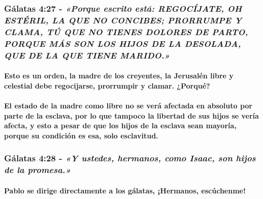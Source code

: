\documentclass[11a pt,twoside]{article}
\newcommand{\scripture}[1]{%
  {\fontsize{12pt}{16pt}\selectfont\ScriptureFont\itshape #1}%
}
\let\oldsubsubsection\subsubsection
\renewcommand{\subsubsection}{\needspace{4\baselineskip}\oldsubsubsection}
\let\oldparagraph\paragraph
\renewcommand{\paragraph}{\needspace{3\baselineskip}\oldparagraph}
\begin{document}
\subsubsection{\texorpdfstring{Gálatas 4:27 -
\scripture{«Porque escrito está: REGOCÍJATE, OH ESTÉRIL, LA QUE NO CONCIBES; PRORRUMPE Y CLAMA, TÚ QUE NO TIENES DOLORES DE PARTO, PORQUE MÁS SON LOS HIJOS DE LA DESOLADA, QUE DE LA QUE TIENE MARIDO.»}}{Gálatas 4:27 - }}\label{guxe1latas-427---porque-escrito-estuxe1-regocuxedjate-oh-estuxe9ril-la-que-no-concibes-prorrumpe-y-clama-tuxfa-que-no-tienes-dolores-de-parto-porque-muxe1s-son-los-hijos-de-la-desolada-que-de-la-que-tiene-marido.}

\paragraph{Esto es un orden, la madre de los creyentes, la Jerusalén
libre y celestial debe regocijarse, prorrumpir y clamar.
¿Porqué?}\label{esto-es-un-orden-la-madre-de-los-creyentes-la-jerusaluxe9n-libre-y-celestial-debe-regocijarse-prorrumpir-y-clamar.-porquuxe9}

\paragraph{El estado de la madre como libre no se verá afectada en
absoluto por parte de la esclava, por lo que tampoco la libertad de sus
hijos se vería afecta, y esto a pesar de que los hijos de la esclava
sean mayoría, porque su condición es esa, solo
esclavitud.}\label{el-estado-de-la-madre-como-libre-no-se-veruxe1-afectada-en-absoluto-por-parte-de-la-esclava-por-lo-que-tampoco-la-libertad-de-sus-hijos-se-veruxeda-afecta-y-esto-a-pesar-de-que-los-hijos-de-la-esclava-sean-mayoruxeda-porque-su-condiciuxf3n-es-esa-solo-esclavitud.}

\subsubsection{\texorpdfstring{Gálatas 4:28 -
\scripture{«Y ustedes, hermanos, como Isaac, son hijos de la promesa.»}}{Gálatas 4:28 - }}\label{guxe1latas-428---y-ustedes-hermanos-como-isaac-son-hijos-de-la-promesa.}

\paragraph{Pablo se dirige directamente a los gálatas, ¡Hermanos,
escúchenme!}\label{pablo-se-dirige-directamente-a-los-guxe1latas-hermanos-escuxfachenme}
\end{document}
